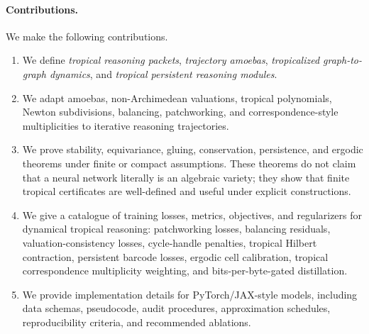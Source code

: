 \documentclass[11pt]{article}
\begin{document}
\paragraph{Contributions.}
We make the following contributions.
\begin{enumerate}
\item We define \emph{tropical reasoning packets}, \emph{trajectory amoebas}, \emph{tropicalized graph-to-graph dynamics}, and \emph{tropical persistent reasoning modules}.
\item We adapt amoebas, non-Archimedean valuations, tropical polynomials, Newton subdivisions, balancing, patchworking, and correspondence-style multiplicities to iterative reasoning trajectories.
\item We prove stability, equivariance, gluing, conservation, persistence, and ergodic theorems under finite or compact assumptions.  These theorems do not claim that a neural network literally is an algebraic variety; they show that finite tropical certificates are well-defined and useful under explicit constructions.
\item We give a catalogue of training losses, metrics, objectives, and regularizers for dynamical tropical reasoning: patchworking losses, balancing residuals, valuation-consistency losses, cycle-handle penalties, tropical Hilbert contraction, persistent barcode losses, ergodic cell calibration, tropical correspondence multiplicity weighting, and bits-per-byte-gated distillation.
\item We provide implementation details for PyTorch/JAX-style models, including data schemas, pseudocode, audit procedures, approximation schedules, reproducibility criteria, and recommended ablations.
\end{enumerate}
\end{document}

